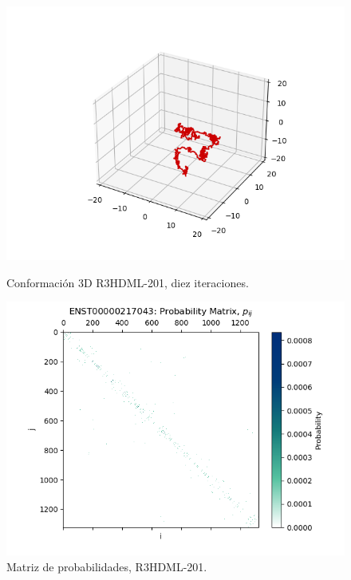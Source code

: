 \documentclass[a4paper,11pt,titlepage]{article}
\theoremstyle{definition}
\begin{document}
\begin{figure}[H]
    \centering
    \begin{minipage}[c]{0.45\textwidth}
        \centering
        \includegraphics[width=\textwidth]{images/R3HDML-201-db_iter.png}
        \caption{Conformación 3D R3HDML-201, diez iteraciones.}
        \label{fig:R3HDML-201-multi}
    \end{minipage}
    \hfill
    \begin{minipage}[c]{0.45\textwidth}
        \centering
        \includegraphics[width=\textwidth]{images/R3HDML-201-db_iter-matrix.png}
        \caption{Matriz de probabilidades, R3HDML-201.}
        \label{fig:R3HDML-201-matrix}
    \end{minipage}
\end{figure}
\end{document}
